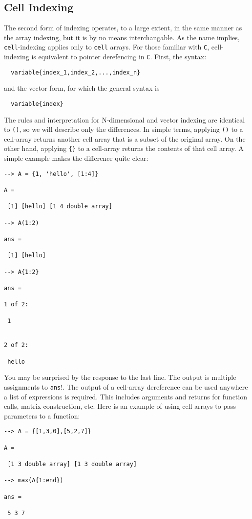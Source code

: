 \subsection{Cell Indexing}

The second form of indexing operates, to a large extent, in
the same manner as the array indexing, but it is by no means
interchangable.  As the name implies, \verb|cell|-indexing applies
only to \verb|cell| arrays.  For those familiar with \verb|C|, cell-
indexing is equivalent to pointer derefencing in \verb|C|.  First,
the syntax:
\begin{verbatim}
  variable{index_1,index_2,...,index_n}
\end{verbatim}
and the vector form, for which the general syntax is
\begin{verbatim}
  variable{index}
\end{verbatim}
The rules and interpretation for N-dimensional and vector indexing
are identical to \verb|()|, so we will describe only the differences.
In simple terms, applying \verb|()| to a cell-array returns another
cell array that is a subset of the original array.  On the other
hand, applying \verb|{}| to a cell-array returns the contents of that
cell array.  A simple example makes the difference quite clear:
\begin{verbatim}
--> A = {1, 'hello', [1:4]}

A = 

 [1] [hello] [1 4 double array] 

--> A(1:2)

ans = 

 [1] [hello] 

--> A{1:2}

ans = 

1 of 2:

 1 


2 of 2:

 hello
\end{verbatim}
You may be surprised by the response to the last line.  The output
is multiple assignments to \verb|ans|!.  The output of a cell-array
dereference can be used anywhere a list of expressions is required.
This includes arguments and returns for function calls, matrix
construction, etc.  Here is an example of using cell-arrays to pass
parameters to a function:
\begin{verbatim}
--> A = {[1,3,0],[5,2,7]}

A = 

 [1 3 double array] [1 3 double array] 

--> max(A{1:end})

ans = 

 5 3 7 
\end{verbatim}
